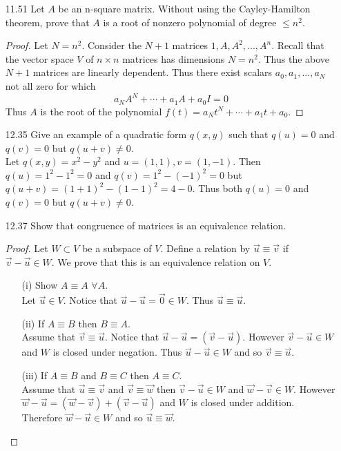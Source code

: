 \documentclass[12pt]{article}
\theoremstyle{definition}
\theoremstyle{plain}
\begin{document}
\begin{enumerate}
\item[11.51]Let $A$ be an n-square matrix. Without using the Cayley-Hamilton theorem, prove that $A$ is a root of nonzero polynomial of degree $\leq n^2$.
	\begin{proof}
	Let $N=n^2$. Consider the $N+1$ matrices $1,A,A^2,...,A^n$. Recall that the vector space $V$ of $n\times n$ matrices has dimensions $N=n^2$. Thus the above $N+1$ matrices are linearly dependent. Thus there exist scalars $a_0,a_1,...,a_N$ not all zero for which
	\[ a_NA^N+\cdots + a_1A+a_0 I = 0 \]
	Thus $A$ is the root of the polynomial $f(t)=a_Nt^N+\cdots +a_1t+a_0$.
	\end{proof}
\item[12.35]Give an example of a quadratic form $q(x,y)$ such that $q(u)=0$ and $q(v)=0$ but $q(u+v)\neq 0$.\\
	Let $q(x,y)=x^2-y^2$ and $u=(1,1),v=(1,-1)$. Then $q(u)=1^2-1^2 = 0$ and $q(v)=1^2-(-1)^2=0$ but $q(u+v)=(1+1)^2-(1-1)^2=4-0$. Thus both $q(u)=0$ and $q(v)=0$ but $q(u+v)\neq 0$.
\item[12.37]Show that congruence of matrices is an equivalence relation.
	\begin{proof}
	Let $W\subset V$ be a subspace of $V$. Define a relation by $\vec{u}\equiv\vec{v}$ if $\vec{v}-\vec{u}\in W$. We prove that this is an equivalence relation on $V$.
	\begin{enumerate}
	\item[(i)]Show $A \equiv A$ $\forall A$.\\
		Let $\vec{u}\in V$. Notice that $\vec{u}-\vec{u}=\vec{0}\in W$. Thus $\vec{u}\equiv\vec{u}$.
	\item[(ii)]If $A \equiv B$ then $B \equiv A$.\\
		Assume that $\vec{v}\equiv\vec{u}$. Notice that $\vec{u}-\vec{u}=(\vec{v}-\vec{u})$. However $\vec{v}-\vec{u}\in W$ and $W$ is closed under negation. Thus $\vec{u}-\vec{u}\in W$ and so $\vec{v}\equiv\vec{u}$.
	\item[(iii)]If $A \equiv B$ and $B \equiv C$ then $A \equiv C$.\\
		Assume that $\vec{u}\equiv\vec{v}$ and $\vec{v}\equiv\vec{w}$ then $\vec{v}-\vec{u}\in W$ and $\vec{w}-\vec{v}\in W$. However $\vec{w}-\vec{u}=(\vec{w}-\vec{v})+(\vec{v}-\vec{u})$ and $W$ is closed under addition. Therefore $\vec{w}-\vec{u}\in W$ and so $\vec{u}\equiv\vec{w}$.
	\end{enumerate}
	\end{proof}



\end{enumerate}
\end{document}
